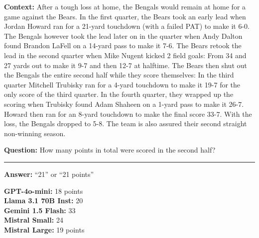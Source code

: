 \begin{tcolorbox}[colback=gray!3, colframe=gray!50, arc=2mm, boxrule=0.5pt, title={\textit{DROP}}, coltitle=black, colbacktitle=gray!20]
    
   \textbf{Context:} After a tough loss at home, the Bengals would remain at home for a game against the Bears.  In the first quarter, the Bears took an early lead when Jordan Howard ran for a 21-yard touchdown (with a failed PAT) to make it 6-0.  The Bengals however took the lead later on in the quarter when Andy Dalton found Brandon LaFell on a 14-yard pass to make it 7-6.  The Bears retook the lead in the second quarter when Mike Nugent kicked 2 field goals:  From 34 and 27 yards out to make it 9-7 and then 12-7 at halftime.  The Bears then shut out the Bengals the entire second half while they score themselves:  In the third quarter Mitchell Trubisky ran for a 4-yard touchdown to make it 19-7 for the only score of the third quarter.  In the fourth quarter, they wrapped up the scoring when Trubisky found Adam Shaheen on a 1-yard pass to make it 26-7.  Howard then ran for an 8-yard touchdown to make the final score 33-7. With the loss, the Bengals dropped to 5-8.  The team is also assured their second straight non-winning season.

\textbf{Question:} How many points in total were scored in the second half?

    \noindent
    \begin{center}
        \rule{0.9\textwidth}{0.4pt}
    \end{center}
    
    \textbf{Answer:} ``21'' or ``21 points''

    \medskip

    \textbf{GPT-4o-mini:} 18 points\\
    \textbf{Llama 3.1 70B Inst:} 20 \\
    \textbf{Gemini 1.5 Flash:} 33 \\
    \textbf{Mistral Small:} 24 \\
    \textbf{Mistral Large:} 19 points

\end{tcolorbox}

